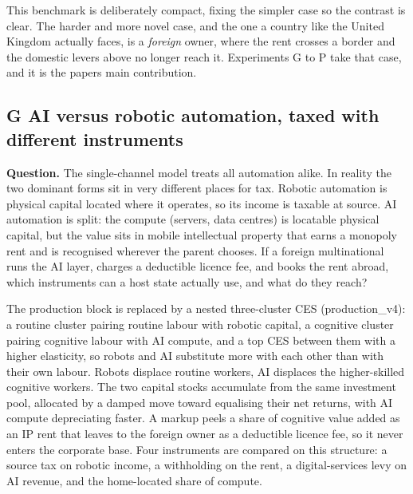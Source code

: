 \documentclass[11pt]{article}
\begin{document}
This benchmark is deliberately compact, fixing the simpler case so the
contrast is clear. The harder and more novel case, and the one a country
like the United Kingdom actually faces, is a \emph{foreign} owner, where
the rent crosses a border and the domestic levers above no longer reach
it. Experiments G to P take that case, and it is the
paper\textquotesingle s main contribution.

\hypertarget{g-ai-versus-robotic-automation-taxed-with-different-instruments}{%
\subsection{G \textperiodcentered{} AI versus robotic automation, taxed with different
instruments}\label{g-ai-versus-robotic-automation-taxed-with-different-instruments}}

\textbf{Question.} The single-channel model treats all automation alike.
In reality the two dominant forms sit in very different places for tax.
Robotic automation is physical capital located where it operates, so its
income is taxable at source. AI automation is split: the compute
(servers, data centres) is locatable physical capital, but the value
sits in mobile intellectual property that earns a monopoly rent and is
recognised wherever the parent chooses. If a foreign multinational runs
the AI layer, charges a deductible licence fee, and books the rent
abroad, which instruments can a host state actually use, and what do
they reach?

The production block is replaced by a nested three-cluster CES
(production\_v4): a routine cluster pairing routine labour with robotic
capital, a cognitive cluster pairing cognitive labour with AI compute,
and a top CES between them with a higher elasticity, so robots and AI
substitute more with each other than with their own labour. Robots
displace routine workers, AI displaces the higher-skilled cognitive
workers. The two capital stocks accumulate from the same investment
pool, allocated by a damped move toward equalising their net returns,
with AI compute depreciating faster. A markup peels a share of cognitive
value added as an IP rent that leaves to the foreign owner as a
deductible licence fee, so it never enters the corporate base. Four
instruments are compared on this structure: a source tax on robotic
income, a withholding on the rent, a digital-services levy on AI
revenue, and the home-located share of compute.
\end{document}
